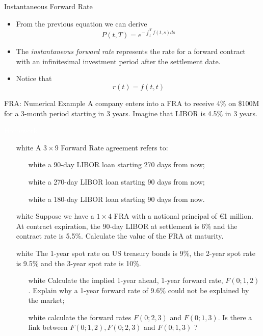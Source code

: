 \documentclass{beamer}
\begin{document}
\begin{frame}{Instantaneous Forward Rate}
	\begin{itemize}
		\item From the previous equation we can derive
		\begin{equation}
			P(t, T) = e^{-\int_t^T f(t, s) ds}
		\end{equation}
		\item The \emph{instantaneous forward rate} represents the rate for a forward contract with an infinitesimal investment period after the settlement date.
		\item Notice that
		\begin{equation*}
			r(t) = f(t,t)
		\end{equation*}
	\end{itemize}
\end{frame}

\begin{frame}{FRA: Numerical Example}
A company enters into a FRA to receive 4\% on \$100M for a 3-month period starting in 3 years. Imagine that LIBOR is 4.5\% in 3 years.



\end{frame}

\begin{homework}
\begin{frame}{\textcolor{white}{Homework}}
\begin{itemize}
	\item[white] A $3\times 9$ Forward Rate agreement refers to:
		\begin{itemize}
			\item[white] a 90-day LIBOR loan starting 270 days from now;
			\item[white] a 270-day LIBOR loan starting 90 days from now;
			\item[white] a 180-day LIBOR loan starting 90 days from now.
		\end{itemize}
	\item[white] Suppose we have a $1\times 4$ FRA with a notional principal of €1 million.  At contract expiration, the 90-day LIBOR at settlement is 6\% and the contract rate is 5.5\%. Calculate the value of the FRA at maturity.
	\item[white] The 1-year spot rate on US treasury bonds is 9\%, the 2-year spot rate is 9.5\% and the 3-year spot rate is 10\%. 
	\begin{itemize}
		\item[white] Calculate the implied 1-year ahead, 1-year forward rate, $F(0;1,2)$. Explain why a 1-year forward rate of 9.6\% could not be explained by the market;
		\item[white] calculate the forward rates  $F(0; 2, 3)$ and $F(0; 1,3)$. Is there a link between $F(0;1,2),F(0;2,3)$ and $F(0;1,3)$ ?
	\end{itemize}
\end{itemize}
\end{frame}
\end{homework}
\end{document}
